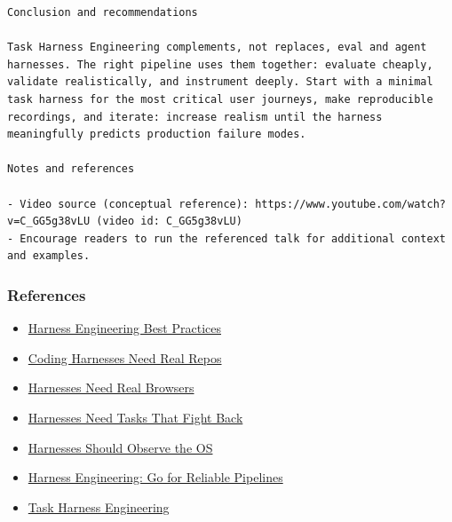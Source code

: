 \documentclass[aspectratio=169]{beamer}
\begin{document}
\begin{frame}[fragile]
\begin{verbatim}
Conclusion and recommendations

Task Harness Engineering complements, not replaces, eval and agent harnesses. The right pipeline uses them together: evaluate cheaply, validate realistically, and instrument deeply. Start with a minimal task harness for the most critical user journeys, make reproducible recordings, and iterate: increase realism until the harness meaningfully predicts production failure modes.

Notes and references

- Video source (conceptual reference): https://www.youtube.com/watch?v=C_GG5g38vLU (video id: C_GG5g38vLU)
- Encourage readers to run the referenced talk for additional context and examples.
\end{verbatim}
\end{frame}

\begin{frame}
\frametitle{References}
\begin{itemize}
  \item \href{https://blog.hackspree.com/#harness-engineering-best-practices-for-ai-agents}{Harness Engineering Best Practices}
  \item \href{https://blog.hackspree.com/#coding-agent-harnesses-need-real-repositories}{Coding Harnesses Need Real Repos}
  \item \href{https://blog.hackspree.com/#harnesses-need-real-browsers-not-polite-demos}{Harnesses Need Real Browsers}
  \item \href{https://blog.hackspree.com/#agent-harnesses-need-tasks-that-fight-back}{Harnesses Need Tasks That Fight Back}
  \item \href{https://blog.hackspree.com/#good-harnesses-watch-the-whole-operating-system}{Harnesses Should Observe the OS}
  \item \href{https://blog.hackspree.com/#go-is-good-for-harness-pipelines}{Harness Engineering: Go for Reliable Pipelines}
  \item \href{https://blog.hackspree.com/#task-harness-engineering}{Task Harness Engineering}
\end{itemize}
\end{frame}
\end{document}
